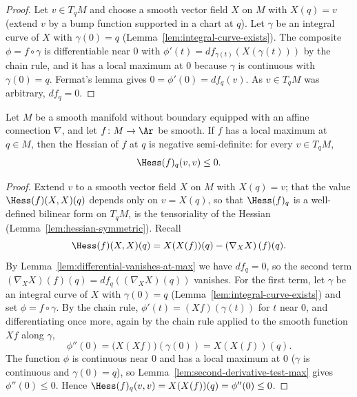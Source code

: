 \begin{proof}
\leanok
{}
Let $v\in T_qM$ and choose a smooth vector field $X$ on $M$ with
$X(q)=v$ (extend $v$ by a bump function supported in a chart at $q$).
Let $\gamma$ be an integral curve of $X$ with $\gamma(0)=q$
(Lemma~\ref{lem:integral-curve-exists}). The composite
$\phi=f\circ\gamma$ is differentiable near $0$ with
$\phi'(t)=df_{\gamma(t)}\!\left(X(\gamma(t))\right)$ by the chain
rule, and it has a local maximum at $0$ because $\gamma$ is continuous
with $\gamma(0)=q$. Fermat's lemma gives
$0=\phi'(0)=df_q(v)$. As $v\in T_qM$ was arbitrary, $df_q=0$.
\end{proof}

\begin{lemma}
\label{lem:hessian-nonpositive-at-max}
\leanok
{}
Let $M$ be a smooth manifold without boundary equipped with an affine
connection $\nabla$, and let $f\colon M\to\Ar$ be smooth. If $f$ has a
local maximum at $q\in M$, then the Hessian of $f$ at $q$ is negative
semi-definite: for every $v\in T_qM$,
$$\Hess(f)_q(v,v)\le0.$$
\end{lemma}

\begin{proof}
\leanok
{}
Extend $v$ to a smooth vector field $X$ on $M$ with $X(q)=v$; that the
value $\Hess(f)(X,X)(q)$ depends only on $v=X(q)$, so that
$\Hess(f)_q$ is a well-defined bilinear form on $T_qM$, is the
tensoriality of the Hessian (Lemma~\ref{lem:hessian-symmetric}).
Recall
$$\Hess(f)(X,X)(q)=X(X(f))(q)-\left(\nabla_XX\right)(f)(q).$$
By Lemma~\ref{lem:differential-vanishes-at-max} we have $df_q=0$, so
the second term $\left(\nabla_XX\right)(f)(q)
=df_q\!\left((\nabla_XX)(q)\right)$ vanishes. For the first term, let
$\gamma$ be an integral curve of $X$ with $\gamma(0)=q$
(Lemma~\ref{lem:integral-curve-exists}) and set $\phi=f\circ\gamma$.
By the chain rule, $\phi'(t)=(Xf)(\gamma(t))$ for $t$ near $0$, and
differentiating once more, again by the chain rule applied to the
smooth function $Xf$ along $\gamma$,
$$\phi''(0)=\big(X(Xf)\big)(\gamma(0))=X(X(f))(q).$$
The function $\phi$ is continuous near $0$ and has a local maximum at
$0$ ($\gamma$ is continuous and $\gamma(0)=q$), so
Lemma~\ref{lem:second-derivative-test-max} gives $\phi''(0)\le0$.
Hence $\Hess(f)_q(v,v)=X(X(f))(q)=\phi''(0)\le0$.
\end{proof}

